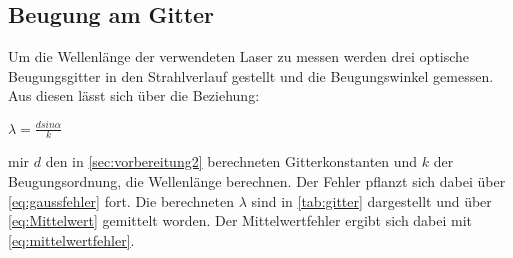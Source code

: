   \subsection{Beugung am Gitter}    
  \label{sec:beugung}
  Um die Wellenlänge der verwendeten Laser zu messen werden drei optische Beugungsgitter in den
  Strahlverlauf gestellt und die Beugungswinkel gemessen. Aus diesen lässt sich über die Beziehung:
   \begin{center}
     $\lambda=\frac{d sin\alpha}{k}$
   \end{center}   
mir $d$ den in \autoref{sec:vorbereitung2} berechneten Gitterkonstanten und $k$ der Beugungsordnung,
die Wellenlänge berechnen. Der Fehler pflanzt sich dabei über \autoref{eq:gaussfehler} fort. Die berechneten
$\lambda$ sind in \autoref{tab:gitter} dargestellt und über \autoref{eq:Mittelwert} gemittelt worden.
Der Mittelwertfehler ergibt sich dabei mit \autoref{eq:mittelwertfehler}.
